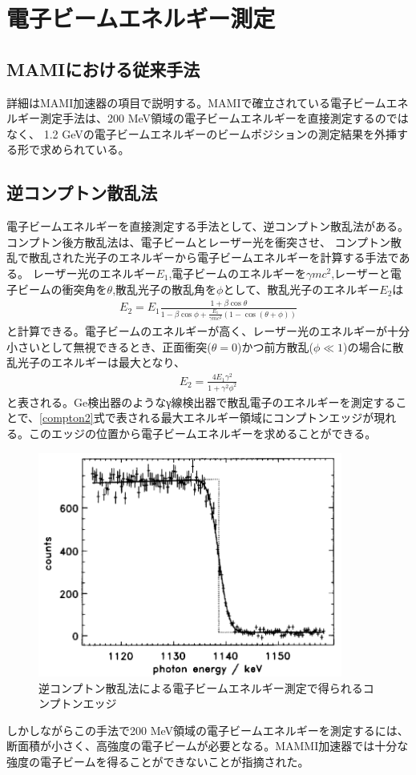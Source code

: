 \documentclass[a4paper,11pt,uplatex]{jsbook}
\begin{document}
\section{電子ビームエネルギー測定}
\subsection{MAMIにおける従来手法}
詳細はMAMI加速器の項目で説明する。MAMIで確立されている電子ビームエネルギー測定手法は、200 MeV領域の電子ビームエネルギーを直接測定するのではなく、
1.2 GeVの電子ビームエネルギーのビームポジションの測定結果を外挿する形で求められている。
\subsection{逆コンプトン散乱法}
電子ビームエネルギーを直接測定する手法として、逆コンプトン散乱法がある。コンプトン後方散乱法は、電子ビームとレーザー光を衝突させ、
コンプトン散乱で散乱された光子のエネルギーから電子ビームエネルギーを計算する手法である。
レーザー光のエネルギー$E_1$,電子ビームのエネルギーを$\gamma mc^2$,レーザーと電子ビームの衝突角を$\theta$,散乱光子の散乱角を$\phi$として、散乱光子のエネルギー$E_2$は
\begin{eqnarray}
  E_2 = E_1\frac{1+\beta\cos{\theta}}{1-\beta\cos{\phi} + \frac{E_1}{\gamma mc^2} (1-\cos{(\theta +\phi)})} \label{compton}
\end{eqnarray}
と計算できる。電子ビームのエネルギーが高く、レーザー光のエネルギーが十分小さいとして無視できるとき、正面衝突($\theta = 0$)かつ前方散乱($\phi \ll 1$)の場合に散乱光子のエネルギーは最大となり、
\begin{eqnarray}
  E_2 = \frac{4E_1\gamma^2}{1 + \gamma^2\phi^2} \label{compton2}
\end{eqnarray}
と表される。Ge検出器のようなγ線検出器で散乱電子のエネルギーを測定することで、\ref{compton2}式で表される最大エネルギー領域にコンプトンエッジが現れる。このエッジの位置から電子ビームエネルギーを求めることができる。
\begin{figure}
  \centering
  \includegraphics[width=10cm]{image/1-CBS.png}
  \caption[逆コンプトン散乱法]{逆コンプトン散乱法による電子ビームエネルギー測定で得られるコンプトンエッジ\cite{klein1997}}
\end{figure}
しかしながらこの手法で200 MeV領域の電子ビームエネルギーを測定するには、断面積が小さく、高強度の電子ビームが必要となる。MAMMI加速器では十分な強度の電子ビームを得ることができないことが指摘された。
\end{document}
